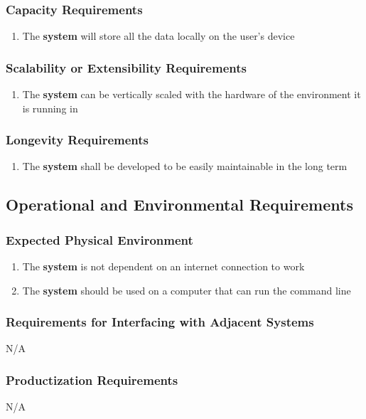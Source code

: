 \documentclass[12pt, titlepage]{article}
\begin{document}
    \subsubsection{Capacity Requirements}
        \begin{enumerate}
            \item The \textbf{system} will store all the data locally on the user's device
        \end{enumerate}
    \subsubsection{Scalability or Extensibility Requirements}
        \begin{enumerate}
            \item The \textbf{system} can be vertically scaled with the hardware of the environment it is running in
        \end{enumerate}
    \subsubsection{Longevity Requirements}
        \begin{enumerate}
            \item The \textbf{system} shall be developed to be easily maintainable in the long term
        \end{enumerate}
\subsection{Operational and Environmental Requirements}
    \subsubsection{Expected Physical Environment}
        \begin{enumerate}
            \item The \textbf{system} is not dependent on an internet connection to work
            \item The \textbf{system} should be used on a computer that can run the command line
        \end{enumerate}
    \subsubsection{Requirements for Interfacing with Adjacent Systems}
        N/A
    \subsubsection{Productization Requirements}
        N/A
\end{document}

